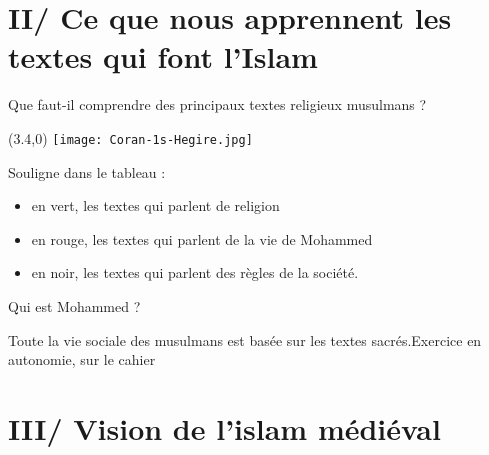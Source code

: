\documentclass{beamer}
\begin{document}
\section{II/ Ce que nous apprennent les textes qui font l'Islam}

\begin{frame}{Que faut-il comprendre des principaux textes religieux musulmans ?}

\begin{textblock}{3}(3.4,0)
\texttt{[image: Coran-1s-Hegire.jpg]}
\end{textblock}

Souligne dans le tableau : 
\begin{itemize}
\item en vert, les textes qui parlent de religion
\item en rouge, les textes qui parlent de la vie de Mohammed
\item en noir, les textes qui parlent des règles de la société.
\end{itemize}
\end{frame}




\begin{frame}{Qui est Mohammed ?}



\end{frame}

\begin{frame}{Toute la vie sociale des musulmans est basée sur les textes sacrés.}{Exercice en autonomie, sur le cahier}



\end{frame}


\section{III/ Vision de l'islam médiéval}
\end{document}
